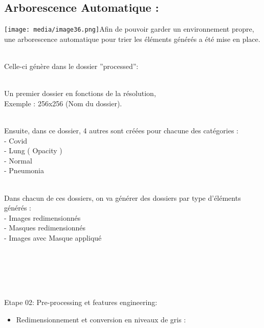 \subsection[\textbf{Arborescence Automatique :}
]{\texorpdfstring{\protect\hypertarget{anchor-46}{}{}\textbf{Arborescence
Automatique :}
}{Arborescence Automatique : }}\label{arborescence-automatique}

\hfill\break
\texttt{[image: media/image36.png]}Afin
de pouvoir garder un environnement propre,\\
une arborescence automatique pour trier les éléments générés a été mise
en place.\\
\strut \\
Celle-ci génère dans le dossier ''processed'':\\
\strut \\
Un premier dossier en fonctions de la résolution,\\
Exemple : 256x256 (Nom du dossier).\\
\strut \\
Ensuite, dans ce dossier, 4 autres sont créées pour chacune des
catégories :\\
- Covid\\
- Lung ( Opacity )\\
- Normal\\
- Pneumonia\\
\strut \\
Dans chacun de ces dossiers, on va générer des dossiers par type
d'éléments générés :\\
- Images redimensionnés\\
- Masques redimensionnés\\
- Images avec Masque appliqué\\
\strut \\
\strut \\

\section{\texorpdfstring{\protect\hypertarget{anchor-47}{}{}\protect\hypertarget{anchor-48}{}{}}{}}\label{section}

Etape 02: Pre-processing et features engineering:

\begin{itemize}
\tightlist
\item
  \protect{}\label{anchor-49}{}\protect{}\label{anchor-50}{}\protect{}\label{anchor-51}{}Redimensionnement
  et conversion en niveaux de gris :
\end{itemize}

